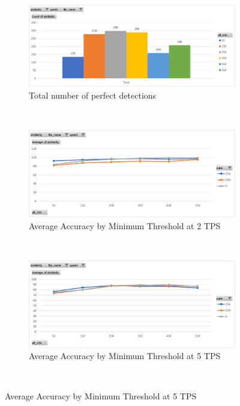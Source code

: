 \begin{figure}
    \caption{Perfect Detections by Minimum Threshold}
    \label{fig:influence-alt-min}
    \begin{subfigure}{\textwidth}
        \centering
        \caption{Total number of perfect detections}
        \label{fig:perfect-detections-by-alt-min-total}
        \includegraphics[width=\linewidth]{Figures/7 Evaluation/perfect_detections_by_alt_min.png}
        \vspace*{.1mm}
    \end{subfigure}\\
    \begin{subfigure}{\textwidth}
        \centering
        \caption{Average Accuracy by Minimum Threshold at 2 TPS}
        \label{fig:influence-alt-min-average-2tps}
        \includegraphics[width=\linewidth]{Figures/7 Evaluation/similarity_by_alt_min_2tps.png}
        \vspace*{.1mm}
    \end{subfigure}\\
    \begin{subfigure}{\textwidth}
        \centering
        \caption{Average Accuracy by Minimum Threshold at 5 TPS}
        \label{fig:influence-alt-min-average-5tps}
        \includegraphics[width=\linewidth]{Figures/7 Evaluation/similarity_by_alt_min_5tps.png}
        \vspace*{.1mm}
    \end{subfigure}\\
\end{figure}


